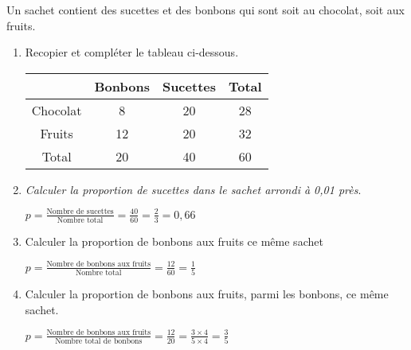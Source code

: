 
Un sachet contient des sucettes et des bonbons qui sont soit au chocolat, soit aux fruits.
\begin{enumerate}
\item Recopier et compléter le tableau ci-dessous.

\begin{tabular}{|c|c|c|c|}
\hline 
  & Bonbons & Sucettes & Total \\ 
\hline 
Chocolat & 8 &  20 & 28  \\ 
\hline 
Fruits & 12  & 20  & 32 \\ 
\hline 
Total & 20 &  40 & 60 \\ 
\hline 
\end{tabular} 

\item \textit{Calculer la proportion de sucettes dans le sachet arrondi à 0,01 près}.

$p=\frac{\text{Nombre de sucettes}}{\text{Nombre total}} = \frac{40}{60} = \frac{2}{3} = 0,66$


\item Calculer la proportion de bonbons aux fruits ce même sachet

$p=\frac{\text{Nombre de bonbons aux fruits}}{\text{Nombre total}} = \frac{12}{60} = \frac{1}{5}$

\item Calculer la proportion de bonbons aux fruits, parmi les bonbons, ce même sachet.

$p=\frac{\text{Nombre de bonbons aux fruits}}{\text{Nombre total de bonbons}} = \frac{12}{20}= \frac{3\times 4}{5\times 4} = \frac{3}{5}$

\end{enumerate}
 